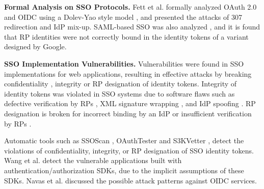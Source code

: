 \noindent\textbf{Formal Analysis on SSO Protocols.}
Fett et al. \cite{FettKS16, FettKS17} formally analyzed OAuth 2.0 and OIDC using a Dolev-Yao style model \cite{FettKS14},
    and presented the attacks of 307 redirection and IdP mix-up.
SAML-based SSO was also analyzed \cite{ArmandoCCCT08},
    and it is found that RP identities were not correctly bound in the identity tokens of a variant designed by Google.



\noindent\textbf{SSO Implementation Vulnerabilities.}
Vulnerabilities were found in SSO implementations for web applications,
    resulting in effective attacks %
     by breaking confidentiality \cite{WangCW12,ccsSunB12,ArmandoCCCPS13,DiscoveringJCS,dimvaLiM16}, integrity \cite{WangCW12,SomorovskyMSKJ12,WangZLG16,MainkaMS16, MainkaMSW17,dimvaLiM16} or RP designation \cite{WangZLG16,MainkaMS16,MainkaMSW17,YangLCZ18,dimvaLiM16} of identity tokens.
Integrity of identity tokens was violated in SSO systems  %
due to software flaws such as
 defective verification by RPs \cite{WangCW12,WangZLG16,MainkaMSW17}, XML signature wrapping \cite{SomorovskyMSKJ12}, and IdP spoofing \cite{MainkaMS16,MainkaMSW17}.
RP designation is broken
    for incorrect binding by an IdP \cite{YangLCZ18,WangZLG16} or insufficient verification by RPs \cite{MainkaMS16,MainkaMSW17,YangLCZ18}.

Automatic tools such as SSOScan \cite{ZhouE14}, OAuthTester \cite{YangLLZH16} and S3KVetter \cite{YangLCZ18},
detect the violations of confidentiality, integrity, or RP designation of SSO identity tokens.
Wang et al. \cite{ExplicatingSDK} detect the vulnerable applications
    built with authentication/authorization SDKs,
     due to the implicit assumptions of these SDKs.
Navas et al. \cite{NavasB19} discussed the possible attack patterns against OIDC services.

